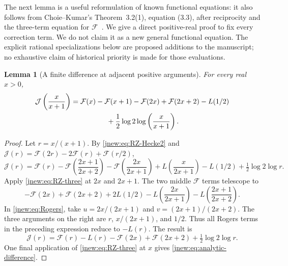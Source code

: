 \documentclass[11pt,a4paper]{article}
\newtheorem{lemma}[theorem]{Lemma}
\theoremstyle{definition}
\theoremstyle{remark}
\numberwithin{equation}{section}
\begin{document}
The next lemma is a useful reformulation of known functional equations:
it also follows from Choie--Kumar's Theorem~3.2(1), equation (3.3),
after reciprocity and the three-term equation for
$\mathcal F$~\cite{ChoieKumar2023}. We give a direct positive-real
proof to fix every correction term. We do not claim it as a new
general functional equation. The explicit rational specializations
below are proposed additions to the manuscript; no exhaustive claim
of historical priority is made for those evaluations.

\begin{lemma}[A finite difference at adjacent positive arguments]
\label{jnew:lem:analytic-difference}
For every real $x>0$,
\begin{align}
 \mathcal J\left(\frac{x}{x+1}\right)
 ={}&\mathcal F(x)-\mathcal F(x+1)-\mathcal F(2x)
       +\mathcal F(2x+2)-L(1/2)\nonumber\\
 &\hspace{13mm}+\frac12\log2\log\left(\frac{x}{x+1}\right).
 \label{jnew:eq:analytic-difference}
\end{align}
\end{lemma}
\begin{proof}
Let $r=x/(x+1)$. By \eqref{jnew:eq:RZ-Hecke2} and
$\mathcal J(r)=\mathcal F(2r)-2\mathcal F(r)+\mathcal F(r/2)$,
\[
 \mathcal J(r)=\mathcal F(r)
 -\mathcal F\left(\frac{2x+1}{2x+2}\right)
 -\mathcal F\left(\frac{2x}{2x+1}\right)
 +L\left(\frac{x}{2x+1}\right)-L(1/2)
 +\tfrac12\log2\log r.
\]
Apply \eqref{jnew:eq:RZ-three} at $2x$ and $2x+1$. The two
middle $\mathcal F$ terms telescope to
\[
 -\mathcal F(2x)+\mathcal F(2x+2)+2L(1/2)
 -L\left(\frac{2x}{2x+1}\right)
 -L\left(\frac{2x+1}{2x+2}\right).
\]
In \eqref{jnew:eq:Rogers}, take
$u=2x/(2x+1)$ and $v=(2x+1)/(2x+2)$.
The three arguments on the right are $r$, $x/(2x+1)$, and $1/2$.
Thus all Rogers terms in the preceding expression reduce to $-L(r)$.
The result is
\[
 \mathcal J(r)=\mathcal F(r)-L(r)-\mathcal F(2x)
                       +\mathcal F(2x+2)+\tfrac12\log2\log r.
\]
One final application of \eqref{jnew:eq:RZ-three} at $x$ gives
\eqref{jnew:eq:analytic-difference}.
\end{proof}
\end{document}
